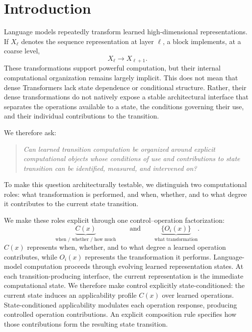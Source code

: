 \documentclass{article}
\begin{document}
\section{Introduction}
\label{sec:introduction}

Language models repeatedly transform learned high-dimensional representations.
If \(X_\ell\) denotes the sequence representation at layer \(\ell\), a block
implements, at a coarse level,
\[
X_\ell\longrightarrow X_{\ell+1}.
\]
These transformations support powerful computation, but their internal
computational organization remains largely implicit. This does not mean that
dense Transformers lack state dependence or conditional structure. Rather,
their dense transformations do not natively expose a stable architectural
interface that separates the operations available to a state, the conditions
governing their use, and their individual contributions to the transition.

We therefore ask:
\begin{quote}
\emph{Can learned transition computation be organized around explicit
computational objects whose conditions of use and contributions to state
transition can be identified, measured, and intervened on?}
\end{quote}

To make this question architecturally testable, we distinguish two computational
roles: what transformation is performed, and when, whether, and to what degree
it contributes to the current state transition.

We make these roles explicit through one control--operation factorization:
\[
\underbrace{C(x)}_{\text{when / whether / how much}}
\qquad\text{and}\qquad
\underbrace{\{O_i(x)\}}_{\text{what transformation}}.
\]
\(C(x)\) represents when, whether, and to what degree a learned operation
contributes, while \(O_i(x)\) represents the transformation it performs.
Language-model computation proceeds through evolving learned representation
states. At each transition-producing interface, the current representation is
the immediate computational state. We therefore make control explicitly
state-conditioned: the current state induces an applicability profile \(C(x)\)
over learned operations.
State-conditioned applicability modulates each operation response, producing
controlled operation contributions. An explicit composition rule specifies how
those contributions form the resulting state transition.
\end{document}
